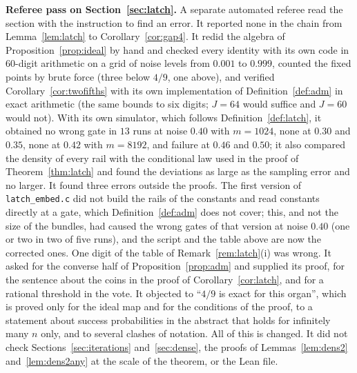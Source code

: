 \documentclass[11pt]{amsart}
\theoremstyle{definition}
\theoremstyle{remark}
\begin{document}
\medskip\noindent\textbf{Referee pass on Section~\ref{sec:latch}.} A separate automated referee
read the section with the instruction to find an error. It reported none in the chain from
Lemma~\ref{lem:latch} to Corollary~\ref{cor:gap4}. It redid the algebra of
Proposition~\ref{prop:ideal} by hand and checked every identity with its own code in $60$-digit
arithmetic on a grid of noise levels from $0.001$ to $0.999$, counted the fixed points by brute
force (three below $4/9$, one above), and verified Corollary~\ref{cor:twofifths} with its own
implementation of Definition~\ref{def:adm} in exact arithmetic (the same bounds to six digits;
$J=64$ would suffice and $J=60$ would not). With its own simulator, which follows
Definition~\ref{def:latch}, it obtained no wrong gate in $13$ runs at noise $0.40$ with $m=1024$,
none at $0.30$ and $0.35$, none at $0.42$ with $m=8192$, and failure at $0.46$ and $0.50$; it also
compared the density of every rail with the conditional law used in the proof of
Theorem~\ref{thm:latch} and found the deviations as large as the sampling error and no larger. It
found three errors outside the proofs. The first version of \texttt{latch\_embed.c} did not build
the rails of the constants and read constants directly at a gate, which Definition~\ref{def:adm}
does not cover; this, and not the size of the bundles, had caused the wrong gates of that version
at noise $0.40$ (one or two in two of five runs), and the script and the table above are now the
corrected ones. One digit of the table of Remark~\ref{rem:latch}(i) was wrong. It asked for the
converse half of Proposition~\ref{prop:adm} and supplied its proof, for the sentence about the
coins in the proof of Corollary~\ref{cor:latch}, and for a rational threshold in the vote. It
objected to ``$4/9$ is exact for this organ'', which is proved only for the ideal map and for the
conditions of the proof, to a statement about success probabilities in the abstract that
holds for infinitely many $n$ only, and to several clashes of notation. All of this is changed.
It did not check Sections~\ref{sec:iterations} and~\ref{sec:dense}, the proofs of Lemmas~\ref{lem:dens2}
and~\ref{lem:dens2any} at the scale of the theorem, or the Lean file.
\end{document}
